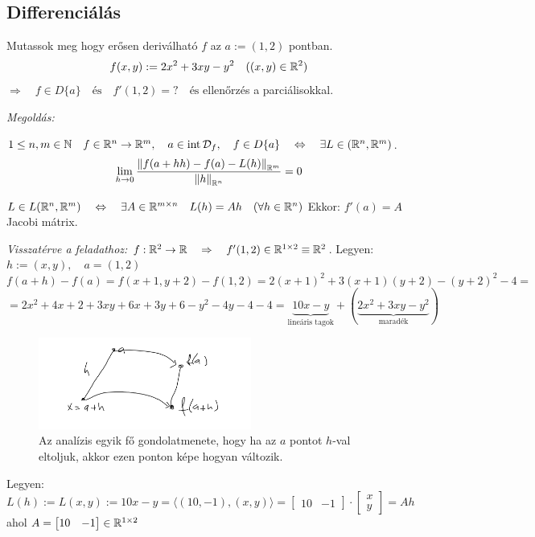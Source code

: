 \documentclass[a4paper,11.5pt]{article}
\DeclareMathOperator{\Int}{int}
\newcommand{\norm}[1]{\left\lVert#1\right\rVert}
\begin{document}
	\subsection{Differenciálás}
	\begin{task} 
		Mutassok meg hogy erősen deriválható $f$ az $a:=(1,2)$ pontban.
		\[ f(x,y):=2x^2+3xy-y^2 \quad ((x,y)\in\mathbb{R}^2) \]
		$\Rightarrow\quad f\in D\{a\}\quad \text{és}\quad f'(1,2)=?\quad \text{és}$ ellenőrzés a parciálisokkal.
		
		\textit{Megoldás:}
		\begin{revision}
			$1\leq n,m\in\N\quad f\in\R^n\to\R^m,\quad a\in \Int \mathcal{D}_f,\quad f\in D\{ a \}\quad \Leftrightarrow \quad \exists L\in\LARGE(\R^n,\R^m)$.
			\[ \lim_{h\to0} \frac{\norm{f(a+hh)-f(a)-L(h)}_{\R^m}}{\norm{h}_{\R^n}}=0 \]
		\end{revision}
		\begin{revision}
			$L\in L(\mathbb{R}^n,\mathbb{R}^m)\quad \Leftrightarrow\quad \exists A\in\mathbb{R}^{m\times n}\quad L(h)=Ah\quad (\forall h\in\mathbb{R}^n)$
		 Ekkor: $f'(a)=A$ Jacobi mátrix.
		\end{revision}
		\textit{Visszatérve a feladathoz:} $f:\mathbb{R}^2\to\mathbb{R}\quad \Rightarrow\quad f'(1,2)\in\mathbb{R}^{1\times 2}\equiv \mathbb{R}{^2}$.\quad 
		Legyen: $h:=(x,y),\quad a=(1,2)$
		\[ f(a+h)-f(a)=f(x+1,y+2)-f(1,2)=2(x+1)^2+3(x+1)(y+2)-(y+2)^2-4=\]\[=2x^2+4x+2+3xy+6x+3y+6-y^2-4y-4-4=\underbrace{10x-y}_{\text{lineáris tagok}}+(\underbrace{2x^2+3xy-y^2}_{\text{maradék}}) \]
		\begin{figure}[H]
			\centering
			\includegraphics[height=3cm]{../2zh/kepek/28.png}
			\caption{Az analízis egyik fő gondolatmenete, hogy ha az $a$ pontot $h$-val eltoljuk, akkor ezen ponton képe hogyan változik.}
		\end{figure}
		Legyen: $L(h):=L(x,y):=10x-y=\langle(10,-1),(x,y)\rangle=\begin{bmatrix}
			10&-1
		\end{bmatrix}\cdot \begin{bmatrix}
			x\\y
		\end{bmatrix} =Ah$ ahol $A=\begin{bmatrix}
		10&-1
		\end{bmatrix}\in\mathbb{R}^{1\times2}$
		

\end{task}
\end{document}
